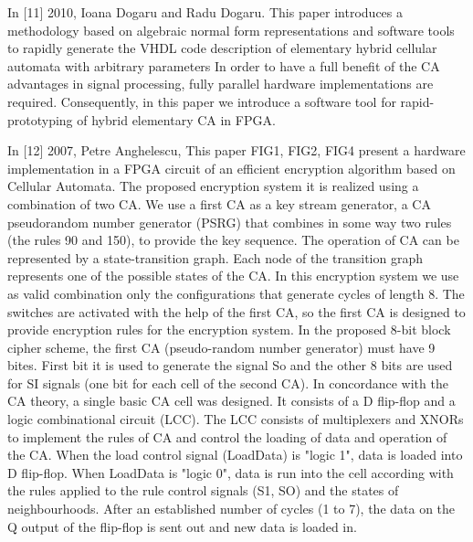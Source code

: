 In [11] 2010,  Ioana Dogaru and Radu Dogaru. This paper introduces a methodology based on algebraic normal form representations and software tools to rapidly generate the VHDL code description of elementary hybrid cellular automata with arbitrary parameters In order to have a full benefit of the CA advantages in signal processing, fully parallel hardware implementations are required. Consequently, in this paper we introduce a software tool for rapid-prototyping of hybrid elementary CA in FPGA. 

In [12] 2007, Petre Anghelescu, This paper FIG1, FIG2, FIG4 present a hardware implementation in a FPGA circuit of an efficient encryption algorithm based on Cellular Automata. The proposed encryption system it is realized using a combination of two CA. We use a first CA as a key stream generator, a CA pseudorandom number generator (PSRG) that combines in some way two rules (the rules 90 and 150), to provide the key sequence. The operation of CA can be represented by a state-transition graph. Each node of the transition graph represents one of the possible states of the CA. In this encryption system we use as valid combination only the configurations that generate cycles of length 8. The switches are activated with the help of the first CA, so the first CA is designed to provide encryption rules for the encryption system. In the proposed 8-bit block cipher scheme, the first CA (pseudo-random number generator) must have 9 bites. First bit it is used to generate the signal So and the other 8 bits are used for SI signals (one bit for each cell of the second CA). In concordance with the CA theory, a single basic CA cell was designed. It consists of a D flip-flop and a logic combinational circuit (LCC). The LCC consists of multiplexers and XNORs to implement the rules of CA and control the loading of data and operation of the CA. When the load control signal (LoadData) is "logic 1", data is loaded into D flip-flop. When LoadData is "logic 0", data is run into the cell according with the rules applied to the rule control signals (S1, SO) and the states of neighbourhoods. After an established number of cycles (1 to 7), the data on the Q output of the flip-flop is sent out and new data is loaded in.